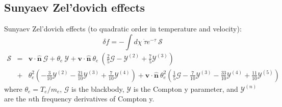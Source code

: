 \documentclass[aps,nofootinbib,groupedaddress]{revtex4}
\begin{document}
\subsection{Sunyaev Zel'dovich effects}

Sunyaev Zel'dovich effects (to quadratic order in temperature and velocity):
\begin{equation}
\delta f = -\int d\chi \ \dot{\tau} e^{-\tau} \ \mathcal{S}
\end{equation}
\begin{eqnarray}
\mathcal{S} &=& \mathbf{v} \cdot \mathbf{\hat{n}} \ \mathcal{G} + \theta_e \ \mathcal{Y} +\mathbf{v} \cdot \mathbf{\hat{n}} \ \theta_e \ \left( \frac{2}{5} \mathcal{G} - \mathcal{Y}^{(2)} + \frac{7}{5} \mathcal{Y}^{(3)} \right)  \\
&+& \theta_e^2 \left( - \frac{3}{10} \mathcal{Y}^{(2)} - \frac{21}{10} \mathcal{Y}^{(3)} + \frac{7}{10} \mathcal{Y}^{(4)} \right) 
+ \mathbf{v} \cdot \mathbf{\hat{n}} \ \theta_e^2 \left( \frac{1}{5} \mathcal{G} - \frac{7}{10} \mathcal{Y}^{(3)} - \frac{33}{10} \mathcal{Y}^{(4)}+ \frac{11}{10} \mathcal{Y}^{(5)} \right)
\end{eqnarray}
where $\theta_e = T_e / m_e$, $\mathcal{G}$ is the blackbody, $\mathcal{Y}$ is the Compton y parameter, and  $\mathcal{Y}^{(n)}$ are the $n$th frequency derivatives of Compton y.
\end{document}
